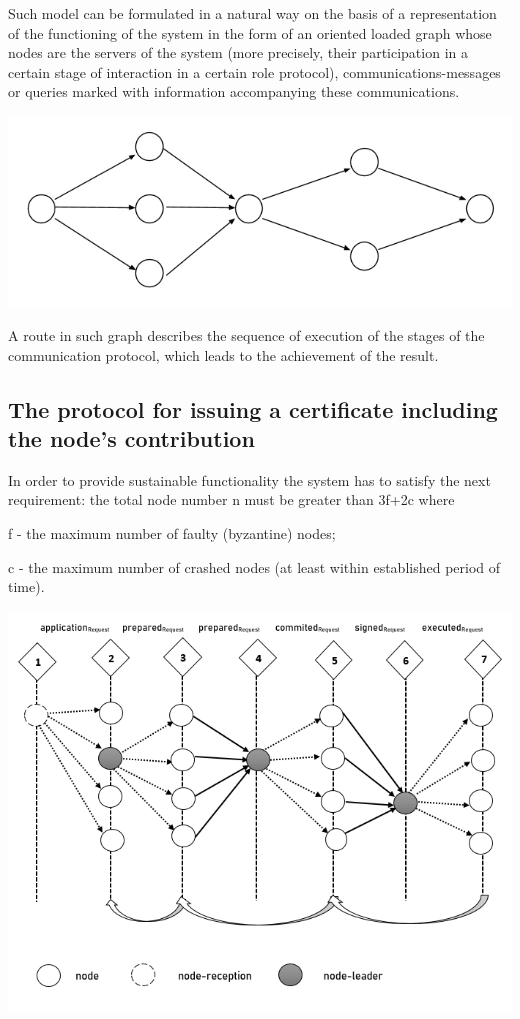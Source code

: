 \documentclass[12pt, a5paper]{article}
\begin{document}
Such model can be formulated in a natural way on the basis of a representation of the functioning of the system in the form of an oriented loaded graph whose nodes are the servers of the system (more precisely, their participation in a certain stage of interaction in a certain role protocol), communications-messages or queries marked with information accompanying these communications.
\begin{center}
\includegraphics[scale=0.5]{Introduction.png}
\end{center}
A route in such graph describes the sequence of execution of the stages of the communication protocol, which leads to the achievement of the result.

\subsection{The protocol for issuing a certificate including the node’s contribution}

In order to provide sustainable functionality the system has to satisfy the next requirement: the total node number n must be greater than 3f+2c where

f - the maximum number of faulty (byzantine) nodes;

c - the maximum number of crashed nodes (at least within established period of time).


\begin{center}
\includegraphics[scale=0.5]{2_2.png}
\end{center}
\end{document}

